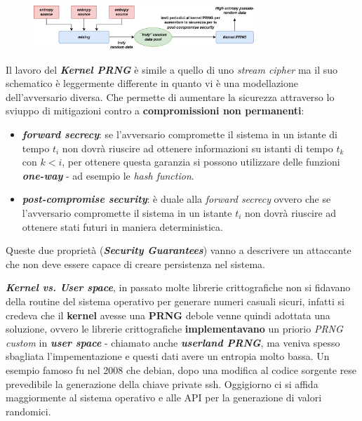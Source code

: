 \begin{flushleft}
    \begin{figure}[h]
        \centering
        \includegraphics[width=0.75\textwidth]{img/prng_pool.png}
    \end{figure}

    Il lavoro del \textbf{\textit{Kernel PRNG}} è simile a quello di uno \textit{stream cipher} ma il suo schematico è leggermente differente in quanto vi è una modellazione dell'avversario diversa. Che permette di aumentare la sicurezza attraverso lo sviuppo di mitigazioni contro a \textbf{compromissioni non permanenti}:
    \begin{itemize}[nosep]
        \item \textbf{\textit{forward secrecy}}: se l'avversario compromette il sistema in un istante di tempo $t_i$ non dovrà riuscire ad ottenere informazioni su istanti di tempo $t_k$ con $k < i$, per ottenere questa garanzia si possono utilizzare delle funzioni \textbf{\textit{one-way}} - ad esempio le \textit{hash function}.
        \item \textbf{\textit{post-compromise security}}: è duale alla \textit{forward secrecy} ovvero che se l'avversario compromette il sistema in un istante $t_i$ non dovrà riuscire ad ottenere stati futuri in maniera deterministica.
    \end{itemize}
    Queste due proprietà (\textbf{\textit{Security Guarantees}}) vanno a descrivere un attaccante che non deve essere capace di creare persistenza nel sistema.

    \smallskip

    \textbf{\textit{Kernel vs. User space}}, in passato molte librerie crittografiche non si fidavano della routine del sistema operativo per generare numeri casuali sicuri, infatti si credeva che il \textbf{kernel} avesse una \textbf{PRNG} debole venne quindi adottata una soluzione, ovvero le librerie crittografiche \textbf{implementavano} un priorio \textit{PRNG custom} in \textbf{\textit{user space}} - chiamato anche \textbf{\textit{userland PRNG}}, ma veniva spesso sbagliata l'impementazione e questi dati avere un entropia molto bassa. Un esempio famoso fu nel 2008 che debian, dopo una modifica al codice sorgente rese prevedibile la generazione della chiave private ssh. Oggigiorno ci si affida maggiormente al sistema operativo e alle API per la generazione di valori randomici.
    

\end{flushleft}
